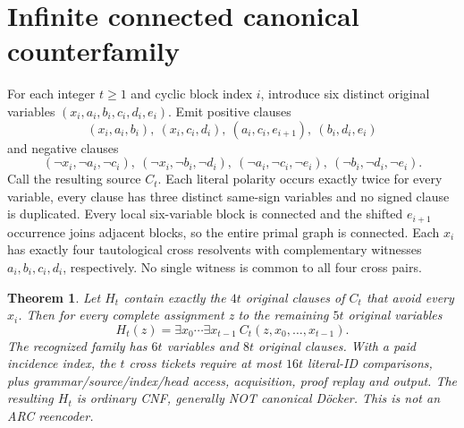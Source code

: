 \documentclass[11pt]{article}
\newtheorem{theorem}{Theorem}
\begin{document}
\section{Infinite connected canonical counterfamily}
For each integer $t\ge1$ and cyclic block index $i$, introduce six distinct original variables $(x_i,a_i,b_i,c_i,d_i,e_i)$. Emit positive clauses
\[
(x_i,a_i,b_i),\ (x_i,c_i,d_i),\ (a_i,c_i,e_{i+1}),\ (b_i,d_i,e_i)
\]
and negative clauses
\[
(\neg x_i,\neg a_i,\neg c_i),\ 
(\neg x_i,\neg b_i,\neg d_i),\
(\neg a_i,\neg c_i,\neg e_i),\
(\neg b_i,\neg d_i,\neg e_i).
\]
Call the resulting source $C_t$. Each literal polarity occurs exactly twice for every variable, every clause has three distinct same-sign variables and no signed clause is duplicated. Every local six-variable block is connected and the shifted $e_{i+1}$ occurrence joins adjacent blocks, so the entire primal graph is connected. Each $x_i$ has exactly four tautological cross resolvents with complementary witnesses $a_i,b_i,c_i,d_i$, respectively. No single witness is common to all four cross pairs.
\begin{theorem}
Let $H_t$ contain exactly the $4t$ original clauses of $C_t$ that avoid every $x_i$. Then for every complete assignment z to the remaining $5t$ original variables
\[
\boxed{H_t(z)=\exists x_0\cdots\exists x_{t-1}\ C_t(z,x_0,\ldots,x_{t-1}).}
\]
The recognized family has $6t$ variables and $8t$ original clauses. With a paid incidence index, the $t$ cross tickets require at most $16t$ literal-ID comparisons, plus grammar/source/index/head access, acquisition, proof replay and output. The resulting $H_t$ is ordinary CNF, generally NOT canonical Döcker. This is not an ARC reencoder.
\end{theorem}
\end{document}
